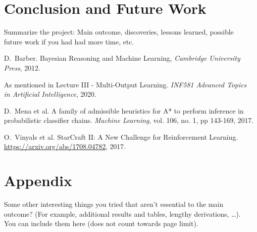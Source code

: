 \documentclass[journal, a4paper]{IEEEtran}
\begin{document}
\section{Conclusion and Future Work}
	Summarize the project: Main outcome, discoveries, lessons learned, possible future work if you had had more time, etc. %

\begin{thebibliography}{4}

	D.~Barber. Bayesian Reasoning and Machine Learning,
	{\em Cambridge University Press}, 2012.

		As mentioned in Lecture III - Multi-Output Learning. \textit{INF581 Advanced Topics in Artificial Intelligence}, 2020.

	D.~Mena et al. A family of admissible heuristics for A* to perform inference in probabilistic classifier chains.
	{\em Machine Learning}, vol. 106, no. 1, pp 143-169, 2017.

	O.~Vinyals et al. StarCraft {II:} {A} New Challenge for Reinforcement Learning.
	\url{https://arxiv.org/abs/1708.04782}, 2017. 

\end{thebibliography}

\newpage
\section*{Appendix}
Some other interesting things you tried that aren't essential to the main outcome? (For example, additional results and tables, lengthy derivations, \ldots). You can include them here (does not count towards page limit). 
\end{document}
